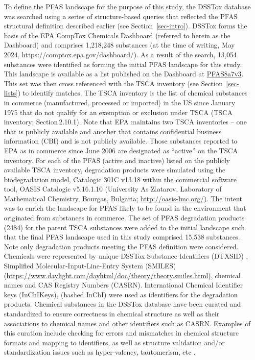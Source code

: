 \documentclass[
  super,
  preprint,
  3p]{elsarticle}
\begin{document}
To define the PFAS landscape for the purpose of this study, the DSSTox
database \citep{grulke_epas_2019, williams_comptox_2017} was searched
using a series of structure-based queries that reflected the PFAS
structural definition described earlier (see Section~\ref{sec-intro}).
DSSTox forms the basis of the EPA CompTox Chemicals Dashboard (referred
to herein as the Dashboard)
\citep{grulke_epas_2019, williams_comptox_2017} and comprises 1,218,248
substances (at the time of writing, May 2024,
https://comptox.epa.gov/dashboard/). As a result of the search, 13,054
substances were identified as forming the initial PFAS landscape for
this study. This landscape is available as a list published on the
Dashboard at
\href{https://comptox.epa.gov/dashboard/chemical-lists/PFAS8a7v3}{PFAS8a7v3}.
This set was then cross referenced with the TSCA inventory (see
Section~\ref{sec-lists}) to identify matches. The TSCA inventory is the
list of chemical substances in commerce (manufactured, processed or
imported) in the US since January 1975 that do not qualify for an
exemption or exclusion under TSCA (TSCA\,inventory; Section\,2.10.1).
Note that EPA maintains two TSCA inventories -- one that is publicly
available and another that contains confidential business information
(CBI) and is not publicly available. Those substances reported to EPA as
in commerce since June 2006 are designated as ``active'' on the TSCA
inventory. For each of the PFAS (active and inactive) listed on the
publicly available TSCA inventory, degradation products were simulated
using the biodegradation model, Catalogic 301C v13.18 within the
commercial software tool, OASIS Catalogic v5.16.1.10 (University As
Zlatarov, Laboratory of Mathematical Chemistry, Bourgas, Bulgaria;
\url{http://oasis-lmc.org/}). The intent was to enrich the landscape for
PFAS likely to be found in the environment that originated from
substances in commerce. The set of PFAS degradation products (2484) for
the parent TSCA substances were added to the initial landscape such that
the final PFAS landscape used in this study comprised 15,538 substances.
Note only degradation products meeting the PFAS definition were
considered. Chemicals were represented by unique DSSTox Substance
Identifiers (DTXSID) \citep{grulke_epas_2019}, Simplified
Molecular-Input-Line-Entry System (SMILES)
(\url{https://www.daylight.com/dayhtml/doc/theory/theory.smiles.html}),
chemical names and CAS Registry Numbers (CASRN). International Chemical
Identifier keys (InChIKeys), (hashed InChI) \citep{heller_inchi_2015}
were used as identifiers for the degradation products. Chemical
substances in the DSSTox database have been curated and standardized to
ensure correctness in chemical structure as well as their associations
to chemical names and other identifiers such as CASRN. Examples of this
curation include checking for errors and mismatches in chemical
structure formats and mapping to identifiers, as well as structure
validation and/or standardization issues such as hyper-valency,
tautomerism, etc \citep{grulke_epas_2019}.
\end{document}
